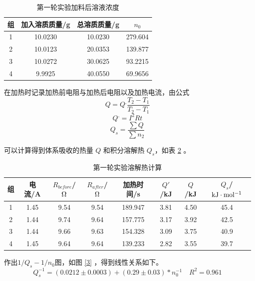 \documentclass[cn,hazy,pku,12pt,normal,math=newtx,cite=super]{elegantnote}
\begin{document}
\begin{table}[h]
    \centering
    \caption{第一轮实验加料后溶液浓度}
    \label{01}
    \begin{tabular}{cccc}
    \hline
    组&加入溶质质量/g & 总溶质质量/g & $n_0$   \\ \hline
    1&10.0230  & 10.0230 & 279.604 \\
    2&10.0123  & 20.0353 & 139.877 \\
    3&10.0272  & 30.0625 & 93.2215 \\
    4&9.9925   & 40.0550 & 69.9656 \\ \hline
    \end{tabular}
\end{table}

在加热时记录加热前电阻与加热后电阻以及加热电流，由公式
\begin{equation}
    Q = Q^, \frac{T_2-T_1}{T_2^,-T_1^,}
\end{equation}
\begin{equation}
    Q^, = I^2Rt
\end{equation}
\begin{equation}
    Q_s = \frac{\sum Q}{\sum n_2}
\end{equation}

可以计算得到体系吸收的热量 $Q$ 和积分溶解热 $Q_s$，如表 \ref{02} 。

\begin{table}[h]
    \centering
    \caption{第一轮实验溶解热计算}
    \label{02}
    \begin{tabular}{cccccccc}
    \hline
    组&电流/A & $R_{before}$/$\rm \Omega$ & $R_{after}$/$\rm \Omega$ & 加热时间/s & $Q'$/kJ & $Q$/kJ & $Q_s$/$\rm kJ \cdot mol^{-1}$ \\ \hline
    1&1.45 & 9.54 & 9.54 & 189.947 & 3.81 & 4.50 & 45.4 \\
    2&1.44 & 9.74 & 9.64 & 157.775 & 3.17 & 3.92 & 42.5 \\
    3&1.44 & 9.66 & 9.63 & 154.328 & 3.09 & 3.75 & 40.9 \\
    4&1.45 & 9.64 & 9.64 & 139.233 & 2.82 & 3.55 & 39.7 \\ \hline
    \end{tabular}
\end{table}

作出$1/Q_s-1/n_0$图，如图 \ref{3} ，得到线性关系如下。
\begin{equation}\label{-1}
    Q_s^{-1} = (0.0212 \pm 0.0003) + (0.29 \pm 0.03) * n_0^{-1} \quad R^2=0.961
\end{equation}
\end{document}
